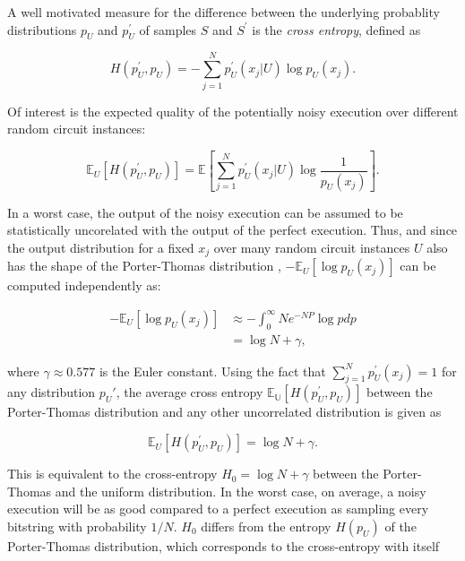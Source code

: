A well motivated measure for the difference between the underlying
probablity distributions $p_U$ and $p_U^{\prime}$ of samples $S$ and $S^{\prime}$ is the \textit{cross entropy}, defined as


\begin{equation}
  H(p_U^{\prime},p_U) = - \sum_{j=1}^Np_U^{\prime}(x_j|U) \log{p_U(x_j)}.
\end{equation}

Of interest is the expected quality of the potentially noisy execution over
different random circuit instances:

\begin{equation}
  \mathbb{E}_U[H(p_U^{\prime},p_U)] = \mathbb{E} [\sum_{j=1}^Np_U^{\prime}(x_j|U)\log{\frac{1}{p_U(x_j)}}].
\end{equation}

In a worst case, the output of the noisy execution can be assumed to
be statistically uncorelated with the output of the perfect execution. Thus,
and since the output distribution for a fixed $x_j$ over many random circuit
instances $U$ also has the shape of the Porter-Thomas distribution \cite{harrow2008random},
$-\mathbb{E}_U[\log{p_U(x_j)}]$ can be computed independently as: 

\begin{align}
  -\mathbb{E}_U[\log{p_U(x_j)}] &\approx - \int_0^{\infty}Ne^{-NP}\log{p} dp \\
                                &= \log{N} + \gamma,
\end{align}

where $\gamma \approx 0.577$ is the Euler constant.
Using the fact that $\sum_{j=1}^Np_U^{\prime}(x_j) = 1$ for any distribution $p_U{\prime}$, the average cross
entropy $\mathbb{E_U}[H(p_U^{\prime},p_U)]$ between the Porter-Thomas distribution and any other uncorrelated distribution is
given as 

\begin{equation}
  \mathbb{E}_U [H(p_U^{\prime},p_U)] = \log{N} + \gamma.
\end{equation}

This is equivalent to the cross-entropy $H_0 = \log{N} + \gamma$ between the
Porter-Thomas and the uniform distribution. In the worst case, on
average, a noisy execution will be as good compared to a perfect execution as sampling
every bitstring with probability $1/N$. $H_0$ differs from the entropy $H(p_U)$ of
the Porter-Thomas distribution, which corresponds to the cross-entropy with
itself

